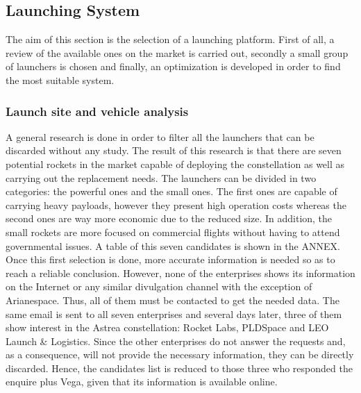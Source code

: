 

\subsection{Launching System}
The aim of this section is the selection of a launching platform. First of all, a review of the available ones on the market is carried out, secondly a small group of launchers is chosen and finally, an optimization is developed in order to find the most suitable system. 
	\subsubsection{Launch site and vehicle analysis}
A general research is done in order to filter all the launchers that can be discarded without any study. The result of this research is that there are seven potential rockets in the market capable of deploying the constellation as well as carrying out the replacement needs. The launchers can be divided in two categories: the powerful ones and the small ones. The first ones are capable of carrying heavy payloads, however they present high operation costs whereas the second ones are way more economic due to the reduced size. In addition, the small rockets are more focused on commercial flights without having to attend governmental issues. A table of this seven candidates is shown in the ANNEX.
\newline\newline
Once this first selection is done, more accurate information is needed so as to reach a reliable conclusion. However, none of the enterprises shows its information on the Internet or any similar divulgation channel with the exception of Arianespace. Thus, all of them must be contacted to get the needed data. The same email is sent to all seven enterprises and several days later, three of them show interest in the Astrea constellation: Rocket Labs, PLDSpace and LEO Launch \& Logistics. Since the other enterprises do not answer the requests and, as a consequence, will not provide the necessary information, they can be directly discarded. Hence, the candidates list is reduced to those three who responded the enquire plus Vega, given that its information is available online. 
\newline\newline
